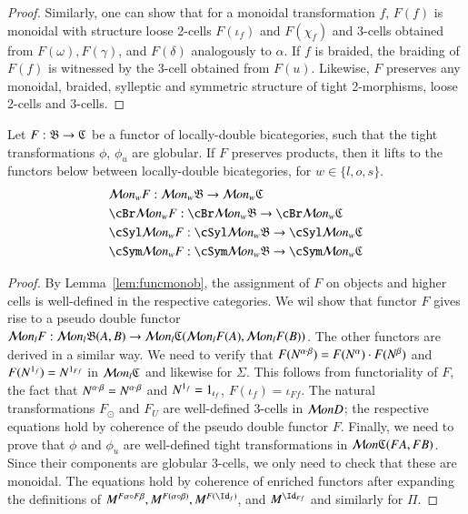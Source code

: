 \begin{proof}

Similarly, one can show that for a monoidal transformation $f$, $F(f)$ is monoidal with structure loose 2-cells $F(\iota_f)$ and $F(\chi_f)$ and 3-cells obtained from $F(\omega),  F(\gamma)$, and $F(\delta)$ analogously to $\alpha$. If $f$ is braided, the braiding of $F(f)$ is witnessed by the 3-cell obtained from $F(u)$. Likewise, $F$ preserves any monoidal, braided, sylleptic and symmetric structure of tight 2-morphisms, loose 2-cells and 3-cells. 
 \end{proof}

\begin{thm}\label{thm:lcbcfunctor}
Let $F: \mathfrak{B}  \rightarrow \mathfrak{C}$ be a functor of locally-double bicategories, such that the tight transformations $\phi$, $\phi_u$ are globular. If $F$ preserves products, then it lifts to the functors below between locally-double bicategories, for $w \in \{l,o,s\}$.
\begin{align*}
&\cM on_wF: \cM on_w \fB  \rightarrow \cM on_w\fC\\ 
&\cBr \cM on_wF: \cBr \cM on_w \fB  \rightarrow \cBr \cM on_w\fC\\
& \cSyl \cM on_wF: \cSyl \cM on_w \fB  \rightarrow \cSyl \cM on_w\fC\\
&\cSym \cM on_wF: \cSym \cM on_w \fB  \rightarrow \cSym \cM on_w\fC
\end{align*}
\end{thm}

\begin{proof}
By Lemma~\ref{lem:funcmonob}, the assignment of $F$ on objects and higher cells is well-defined in the respective categories.
We wil show that functor $F$ gives rise to a pseudo double functor $\mathcal{M} on_lF: \mathcal{M} on_l \mathfrak{B}(A, B)  \rightarrow \mathcal{M} on_l\mathfrak{C}(\mathcal{M} on_lF(A), \mathcal{M} on_lF(B))$. The other functors are derived in a similar way. We need to verify that $F(N^{\alpha \cdot \beta}) = F(N^{\alpha}) \cdot F(N^{\beta})$ and $F(N^{1_f}) = N^{1_{Ff}}$ in $\mathcal{M} on_l\mathfrak{C}$ and likewise for $\Sigma$. This follows from functoriality of $F$, the fact that $N^{\alpha \cdot \beta} = N^{\alpha \cdot \beta}$ and $N^{1_f} = 1_{\iota_f}$, $F(\iota_f) = \iota_{Ff}$.
The natural transformations $F_{\odot}$ and $F_U$ are well-defined 3-cells in $\mathcal{M} onD$; the respective equations hold by coherence of the pseudo double functor $F$.
Finally, we need to prove that $\phi$ and $\phi_u$ are well-defined tight transformations in $\mathcal{M} on \mathfrak{C}(F A, F B)$. Since their components are globular 3-cells, we only need to check that these are monoidal. The equations hold by coherence of enriched functors after expanding the definitions of $M^{F\alpha \comp F \beta}, M^{F(\alpha \comp \beta)}, M^{F(\looseid_f)}$, and $M^{\looseid_{F f}}$ and similarly for $\Pi$.
\end{proof}

